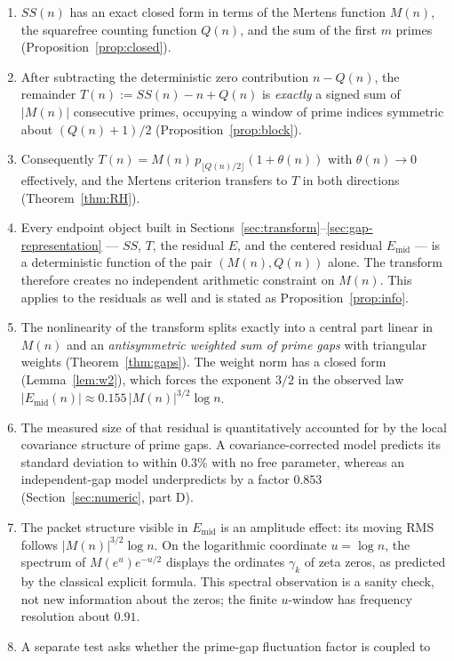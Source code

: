 \documentclass[11pt]{amsart}
\numberwithin{equation}{section}
\theoremstyle{plain}
\theoremstyle{definition}
\theoremstyle{remark}
\newcommand{\Mert}{M}
\newcommand{\Sq}{Q}
\begin{document}
\begin{enumerate}[label=(\roman*)]
\item $SS(n)$ has an exact closed form in terms of the Mertens function
$\Mert(n)$, the squarefree counting function $\Sq(n)$, and the sum of the first
$m$ primes (Proposition~\ref{prop:closed}).
\item After subtracting the deterministic zero contribution $n-\Sq(n)$, the
remainder $T(n):=SS(n)-n+\Sq(n)$ is \emph{exactly} a signed sum of $|\Mert(n)|$
consecutive primes, occupying a window of prime indices symmetric about
$(\Sq(n)+1)/2$ (Proposition~\ref{prop:block}).
\item Consequently $T(n)=\Mert(n)\,p_{\lfloor \Sq(n)/2\rfloor}(1+\theta(n))$
with $\theta(n)\to0$ effectively, and the Mertens criterion transfers to $T$ in
both directions (Theorem~\ref{thm:RH}).
\item Every endpoint object built in Sections~\ref{sec:transform}--\ref{sec:gap-representation} --- $SS$, $T$, the residual $E$, and the centered
residual $E_{\mathrm{mid}}$ --- is a deterministic function of the pair
$(\Mert(n),\Sq(n))$ alone. The transform therefore creates no independent
arithmetic constraint on $\Mert(n)$. This applies to the residuals as well and
is stated as Proposition~\ref{prop:info}.
\item The nonlinearity of the transform splits exactly into a central part
linear in $\Mert(n)$ and an \emph{antisymmetric weighted sum of prime gaps}
with triangular weights (Theorem~\ref{thm:gaps}). The weight norm has a closed
form (Lemma~\ref{lem:w2}), which forces the exponent $3/2$ in the observed law
$|E_{\mathrm{mid}}(n)|\approx0.155\,|\Mert(n)|^{3/2}\log n$.
\item The measured size of that residual is quantitatively accounted for by the
local covariance structure of prime gaps. A covariance-corrected model predicts
its standard deviation to within $0.3\%$ with no free parameter, whereas an
independent-gap model underpredicts by a factor $0.853$
(Section~\ref{sec:numeric}, part D).
\item The packet structure visible in $E_{\mathrm{mid}}$ is an amplitude effect:
its moving RMS follows $|M(n)|^{3/2}\log n$. On the logarithmic coordinate
$u=\log n$, the spectrum of $M(e^u)e^{-u/2}$ displays the ordinates $\gamma_k$
of zeta zeros, as predicted by the classical explicit formula. This spectral
observation is a sanity check, not new information about the zeros; the finite
$u$-window has frequency resolution about $0.91$.
\item A separate test asks whether the prime-gap fluctuation factor is coupled to

\end{enumerate}
\end{document}

